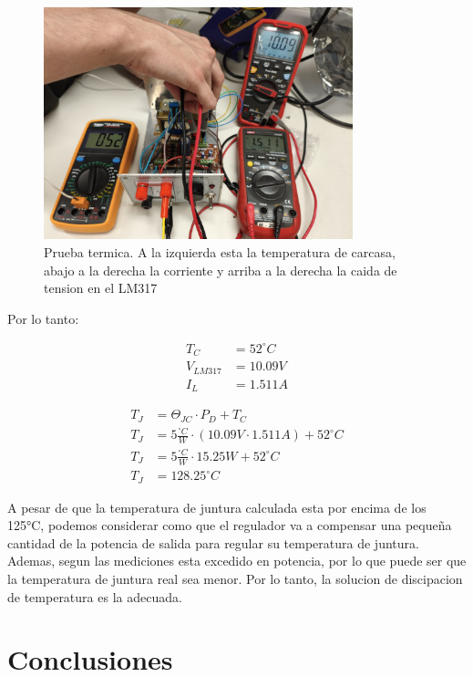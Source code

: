 \documentclass[chaptersright]{informeutn}
\begin{document}
        \begin{figure}[h!]
          \centering
          \includegraphics[width=0.8\textwidth]{pictures/reg_prueb-term.jpeg}
          \caption{Prueba termica. A la izquierda esta la temperatura de carcasa, abajo a la derecha la corriente y
                   arriba a la derecha la caida de tension en el LM317}
        \end{figure}

        Por lo tanto:
        \begin{figure}[h]
          \centering
          \begin{minipage}{0.4\textwidth}
            \begin{align*}
              T_C &= 52^\circ C\\[6pt]
              V_{LM317} &= 10.09V\\[6pt]
              I_L &= 1.511A
            \end{align*}
          \end{minipage}
          \begin{minipage}{0.4\textwidth}
            \begin{align*}
              T_J &= \Theta_{JC} \cdot P_D + T_C\\[6pt]
              T_J &= 5\frac{^\circ C}{W} \cdot (10.09V \cdot 1.511A) + 52^\circ C\\[6pt]
              T_J &= 5\frac{^\circ C}{W} \cdot 15.25W + 52^\circ C\\[6pt]
              T_J &= 128.25^\circ C
            \end{align*}
          \end{minipage}
        \end{figure}

        A pesar de que la temperatura de juntura calculada esta por encima de los 125°C, podemos considerar como que
        el regulador va a compensar una pequeña cantidad de la potencia de salida para regular su temperatura de
        juntura. Ademas, segun las mediciones esta excedido en potencia, por lo que puede ser que la temperatura de
        juntura real sea menor. Por lo tanto, la solucion de discipacion de temperatura es la adecuada.

  \chapter{Conclusiones}
\end{document}
